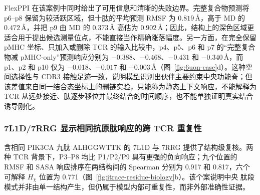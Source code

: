 FlexPPI 在该案例中同时给出了可用信息和清晰的失败边界。完整复合物预测将 p6--p8 保留为较活跃区域，但十肽的平均预测 RMSF 为 $0.819\,\text{\AA}$，高于 MD 的 $0.472\,\text{\AA}$，并把 p9 由 MD 的 $0.373\,\text{\AA}$ 高估为 $0.902\,\text{\AA}$；因此，结构上的深色区域更适合用于提出候选测量位点，不能直接当作精确涨落幅度。另一方面，在完全保留 pMHC 坐标、只加入或删除 TCR 的输入比较中，p4、p5、p6 和 p7 的“完整复合物减 pMHC-only”预测响应分别为 $-0.388$、$-0.468$、$-0.431$ 和 $-0.340\,\text{\AA}$，而 p1、p2 和 p10 仅为 $-0.018$、$-0.017$ 和 $-0.003\,\text{\AA}$（图~\ref{fig:6uon-case}d）。这种空间选择性与 CDR3 接触足迹一致，说明模型识别出伙伴主要约束中央功能脊；但该差值来自同一结合态坐标上的删链实验，只能称为静态上下文响应，不能解释为 TCR 从远处接近、肽逐步移位并最终结合的时间顺序，也不能单独证明真实结合诱导刚化。

\subsubsection{7L1D/7RRG 显示相同抗原肽响应的跨 TCR 重复性}

含相同 PIK3CA 九肽 ALHGGWTTK 的 7L1D 与 7RRG 提供了结构级复核。两种 TCR
背景下，P3--P8 均比 P1/P2/P9 具有更强的负向响应；九个位置的 RMSF 和 SASA
响应排序在两结构间的 Spearman 分别为 0.917 和 0.817，六个可解释
$H_\chi$ 位置为 0.771（图~\ref{fig:itrace-residue-biology}b）。该个案说明中央
肽段模式并非由单一结构产生，但仍属于模型内部可重复性，而非外部准确性证据。
